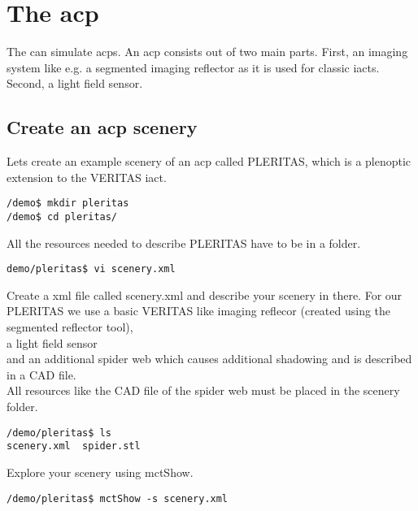 \chapter{The \acf{acp}}
%
The \tool{} can simulate \acp{acp}.
%
An \ac{acp} consists out of two main parts.
%
First, an imaging system like e.g. a segmented imaging reflector as it is used for classic \acp{iact}.
%
Second, a light field sensor.
%
\section{Create an \ac{acp} scenery}
%
Lets create an example scenery of an \ac{acp} called PLERITAS, which is a plenoptic extension to the VERITAS \ac{iact}.
%
\begin{lstlisting}[style=MctBash]
/demo$ mkdir pleritas
/demo$ cd pleritas/
\end{lstlisting}
All the resources needed to describe PLERITAS have to be in a folder.
%
\begin{lstlisting}[style=MctBash]
demo/pleritas$ vi scenery.xml
\end{lstlisting}
%
Create a xml file called scenery.xml and describe your scenery in there.
%
For our PLERITAS we use a basic VERITAS like imaging reflecor (created using the segmented reflector tool),\\
%
%
a light field sensor\\
%
%
and an additional spider web which causes additional shadowing and is described in a CAD file.\\
%
%
\newline
{}
%
%
All resources like the CAD file of the spider web must be placed in the scenery folder.
%
\begin{lstlisting}[style=MctBash]
/demo/pleritas$ ls
scenery.xml  spider.stl
\end{lstlisting}
%

Explore your scenery using mctShow.
%
\begin{lstlisting}[style=MctBash]
/demo/pleritas$ mctShow -s scenery.xml
\end{lstlisting}
%
